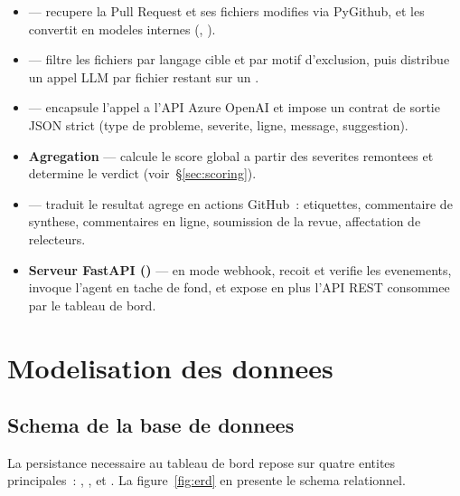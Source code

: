\documentclass[a4paper,12pt,oneside]{report}
\begin{document}
\begin{itemize}
  \item \textbf{} --- recupere la Pull Request et ses fichiers modifies via PyGithub, et les convertit en modeles internes (, ).
  \item \textbf{} --- filtre les fichiers par langage cible et par motif d'exclusion, puis distribue un appel LLM par fichier restant sur un .
  \item \textbf{} --- encapsule l'appel a l'API Azure OpenAI et impose un contrat de sortie JSON strict (type de probleme, severite, ligne, message, suggestion).
  \item \textbf{Agregation} --- calcule le score global a partir des severites remontees et determine le verdict (voir~\S\ref{sec:scoring}).
  \item \textbf{} --- traduit le resultat agrege en actions GitHub~: etiquettes, commentaire de synthese, commentaires en ligne, soumission de la revue, affectation de relecteurs.
  \item \textbf{Serveur FastAPI ()} --- en mode webhook, recoit et verifie les evenements, invoque l'agent en tache de fond, et expose en plus l'API REST consommee par le tableau de bord.
\end{itemize}

\section{Modelisation des donnees}

\subsection{Schema de la base de donnees}

La persistance necessaire au tableau de bord repose sur quatre entites principales~: , ,  et . La figure~\ref{fig:erd} en presente le schema relationnel.
\end{document}
